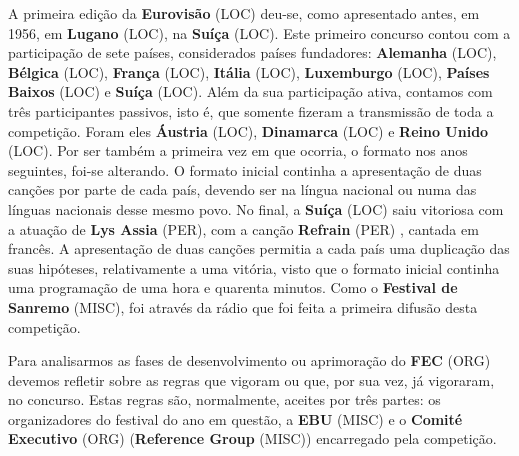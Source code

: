 \documentclass[12pt,a4paper]{article}
\begin{document}
A  primeira  edição  da  \textbf{Eurovisão} (LOC)  deu-se,  como  apresentado  antes,  em  1956,  em \textbf{Lugano} (LOC),  na  \textbf{Suíça} (LOC).  Este  primeiro  concurso  contou  com  a  participação  de  sete  países, considerados países fundadores: \textbf{Alemanha} (LOC), \textbf{Bélgica} (LOC), \textbf{França} (LOC), \textbf{Itália} (LOC), \textbf{Luxemburgo} (LOC), \textbf{Países Baixos} (LOC) e \textbf{Suíça} (LOC). Além da sua participação ativa, contamos com três participantes passivos, isto  é,  que  somente  fizeram  a  transmissão  de  toda  a  competição.  Foram  eles  \textbf{Áustria} (LOC), \textbf{Dinamarca} (LOC) e \textbf{Reino Unido} (LOC). Por ser também a primeira vez em que ocorria, o formato nos anos  seguintes,  foi-se  alterando.  O  formato  inicial  continha  a  apresentação  de  duas canções  por  parte  de  cada  país,  devendo  ser  na  língua  nacional  ou  numa  das  línguas nacionais desse mesmo povo. No final, a \textbf{Suíça} (LOC) saiu vitoriosa com a atuação de \textbf{Lys Assia} (PER), com a canção \textbf{Refrain} (PER) , cantada em francês. A apresentação de duas canções permitia a cada  país  uma  duplicação  das  suas  hipóteses,  relativamente  a  uma  vitória,  visto  que  o formato  inicial  continha  uma  programação  de  uma  hora  e  quarenta  minutos.  Como  o \textbf{Festival  de  Sanremo} (MISC),  foi  através  da  rádio  que  foi  feita  a  primeira  difusão  desta competição.

Para analisarmos as fases de desenvolvimento ou aprimoração do \textbf{FEC} (ORG) devemos refletir sobre as regras que vigoram ou que, por sua vez, já vigoraram, no concurso. Estas regras são, normalmente, aceites por três partes: os organizadores do festival do ano em questão, a \textbf{EBU} (MISC) e o \textbf{Comité Executivo} (ORG) (\textbf{Reference Group} (MISC)) encarregado pela competição.
\end{document}
